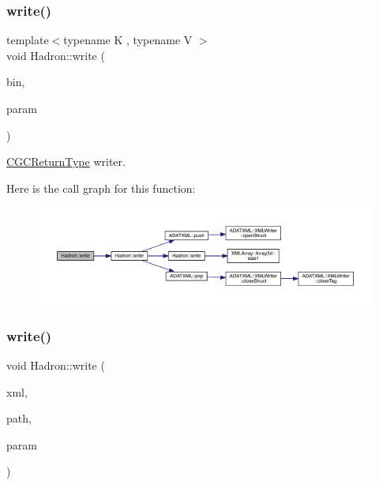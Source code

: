 \subsubsection{\texorpdfstring{write()}{write()}\hspace{0.1cm}{\footnotesize\ttfamily [21/95]}}
{\footnotesize\ttfamily template$<$typename K , typename V $>$ \\
void Hadron\+::write (\begin{DoxyParamCaption}\item[{\mbox{\hyperlink{classADATIO_1_1BinaryWriter}{Binary\+Writer}} \&}]{bin,  }\item[{const \mbox{\hyperlink{structHadron_1_1CGCReturnType}{C\+G\+C\+Return\+Type}}$<$ K, V $>$ \&}]{param }\end{DoxyParamCaption})\hspace{0.3cm}{\ttfamily [inline]}}



\mbox{\hyperlink{structHadron_1_1CGCReturnType}{C\+G\+C\+Return\+Type}} writer. 

Here is the call graph for this function\+:\nopagebreak
\begin{figure}[H]
\begin{center}
\leavevmode
\includegraphics[width=350pt]{d1/daf/namespaceHadron_a67e12d192d662851e588e9f3504ec45e_cgraph}
\end{center}
\end{figure}
\mbox{\label{namespaceHadron_ad432e121844a2fa83775051e43481116}} 
\subsubsection{\texorpdfstring{write()}{write()}\hspace{0.1cm}{\footnotesize\ttfamily [22/95]}}
{\footnotesize\ttfamily void Hadron\+::write (\begin{DoxyParamCaption}\item[{\mbox{\hyperlink{classADATXML_1_1XMLWriter}{X\+M\+L\+Writer}} \&}]{xml,  }\item[{const std\+::string \&}]{path,  }\item[{const \mbox{\hyperlink{structHadron_1_1KeyMesonElementalOperator__t}{Key\+Meson\+Elemental\+Operator\+\_\+t}} \&}]{param }\end{DoxyParamCaption})}



